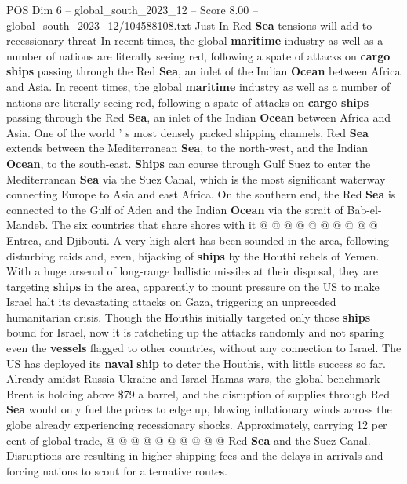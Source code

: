 \begin{textsample}{POS Dim 6 – global\_south\_2023\_12 – Score 8.00 – global\_south\_2023\_12/104588108.txt}  \label{ex:f6_pos_128}
Just In Red \textbf{Sea} tensions will add to recessionary threat In recent times, the global \textbf{maritime} industry as well as a number of nations are literally seeing red, following a spate of attacks on \textbf{cargo} \textbf{ships} passing through the Red \textbf{Sea}, an inlet of the Indian \textbf{Ocean} between Africa and Asia.
In recent times, the global \textbf{maritime} industry as well as a number of nations are literally seeing red, following a spate of attacks on \textbf{cargo} \textbf{ships} passing through the Red \textbf{Sea}, an inlet of the Indian \textbf{Ocean} between Africa and Asia.
One of the world ' s most densely packed shipping channels, Red \textbf{Sea} extends between the Mediterranean \textbf{Sea}, to the north-west, and the Indian \textbf{Ocean}, to the south-east. \textbf{Ships} can course through Gulf Suez to enter the Mediterranean \textbf{Sea} via the Suez Canal, which is the most significant waterway connecting Europe to Asia and east Africa.
On the southern end, the Red \textbf{Sea} is connected to the Gulf of Aden and the Indian \textbf{Ocean} via the strait of Bab-el-Mandeb.
The six countries that share shores with it @ @ @ @ @ @ @ @ @ @ Entrea, and Djibouti.
A very high alert has been sounded in the area, following disturbing raids and, even, hijacking of \textbf{ships} by the Houthi rebels of Yemen.
With a huge arsenal of long-range ballistic missiles at their disposal, they are targeting \textbf{ships} in the area, apparently to mount pressure on the US to make Israel halt its devastating attacks on Gaza, triggering an unpreceded humanitarian crisis.
Though the Houthis initially targeted only those \textbf{ships} bound for Israel, now it is ratcheting up the attacks randomly and not sparing even the \textbf{vessels} flagged to other countries, without any connection to Israel.
The US has deployed its \textbf{naval} \textbf{ship} to deter the Houthis, with little success so far.
Already amidst Russia-Ukraine and Israel-Hamas wars, the global benchmark Brent is holding above \$79 a barrel, and the disruption of supplies through Red \textbf{Sea} would only fuel the prices to edge up, blowing inflationary winds across the globe already experiencing recessionary shocks.
Approximately, carrying 12 per cent of global trade, @ @ @ @ @ @ @ @ @ @ Red \textbf{Sea} and the Suez Canal.
Disruptions are resulting in higher shipping fees and the delays in arrivals and forcing nations to scout for alternative routes.

\end{textsample}
